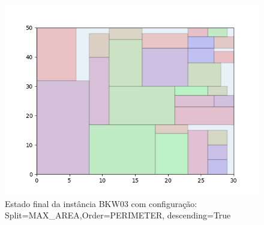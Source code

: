 \begin{figure}[H]
    \centering
    \caption[]{Estado final da instância BKW03 com configuração: Split=MAX_AREA,Order=PERIMETER, descending=True}
    \label{fig:bkw03-max_area-perimeter-true}
    \includegraphics[scale=0.5]{output/figures/bkw/bkw03/max_area/perimeter/true/00}
\end{figure}